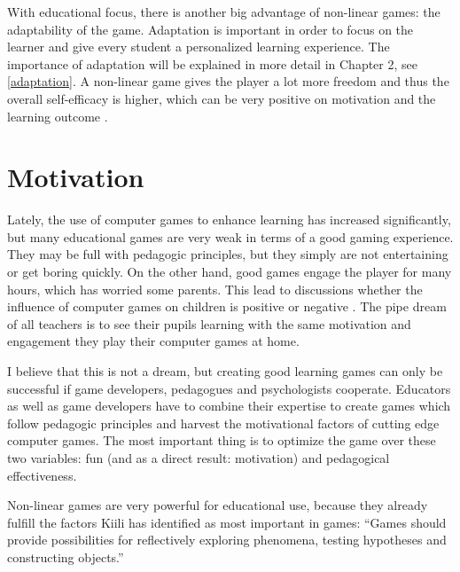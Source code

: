 With educational focus, there is another big advantage of non-linear games:
the adaptability of the game. Adaptation is important in order to focus on the
learner and give every student a personalized learning experience. The
importance of adaptation will be explained in more detail in Chapter 2, see
\ref{adaptation}. A non-linear game gives the player a lot more freedom and
thus the overall self-efficacy is higher, which can be very positive on
motivation and the learning outcome \cite{Zimmerman2000a}.

\section{Motivation}
Lately, the use of computer games to enhance learning has increased
significantly, but many educational games are very weak in terms of a good gaming
experience. They may be full with pedagogic principles, but they simply are not
entertaining or get boring quickly. On the other hand,
good games engage the player for many hours, which has worried some parents.
This lead to discussions
whether the influence of computer games on children is positive or negative
\cite{Southwell2004a}. The pipe dream of all teachers is to see
their pupils learning with the same motivation and engagement they play their
computer games at home.

I believe that this is not a dream, but creating good learning games can only
be successful if game developers, pedagogues and psychologists cooperate.
Educators as well as game developers have to combine their expertise to create games
which follow pedagogic principles and harvest the motivational factors of
cutting edge computer games. The most important thing is to optimize the game
over these two variables: fun (and as a direct result: motivation) and
pedagogical effectiveness. 

Non-linear games are very powerful for educational use, because they already
fulfill the factors Kiili has identified as most important in games: ``Games
should provide possibilities for reflectively exploring phenomena, testing
hypotheses and constructing objects.'' \cite{Kiili2005a}

